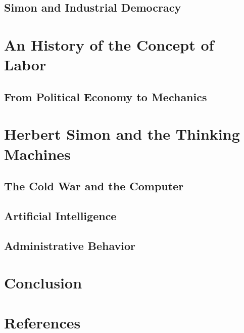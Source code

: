 \documentclass[version=last,draft=false,paper=A4,portrait,twoside=true,twocolumn=false,headinclude=false,footinclude=false,fontsize=11,BCOR=15mm,DIV=calc,pagesize=auto,titlepage=firstiscover,mpinclude=true,open=right,chapterprefix=true,numbers=autoendperiod,headsepline=false,parskip=false]{scrreprt}
\begin{document}
\section{Simon and Industrial Democracy}
\label{sec:org0bd3b04}
\lipsum
\chapter{An History of the Concept of Labor}
\label{sec:org91844f3}
\section{From Political Economy to Mechanics}
\label{sec:org3df3404}
\lipsum
\chapter{Herbert Simon and the Thinking Machines}
\label{sec:org3a09a0f}
\section{The Cold War and the Computer}
\label{sec:org31b3eba}
\lipsum
\section{Artificial Intelligence}
\label{sec:orgda032f3}
\lipsum
\section{Administrative Behavior}
\label{sec:org795bd18}
\lipsum
\chapter{Conclusion}
\label{sec:orga14f065}
\lipsum
\chapter{References}
\label{sec:orgd134295}
\end{document}
